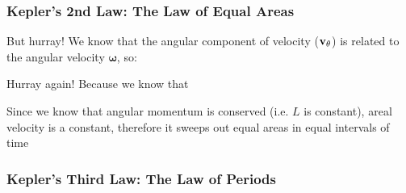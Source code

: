 \documentclass[12pt,compress,aspectratio=169]{beamer}
\newcommand{\mb}[1]{\ensuremath\mathbf{#1}}
\begin{document}
\begin{frame}
  \frametitle{Kepler's 2nd Law: The Law of Equal Areas}

  But hurray! We know that the angular component of velocity ($\mb{v}_\theta$)
  is related to the angular velocity $\bm{\omega}$, so:
    

  Hurray again! Because we know that
    
  \vspace{-.4in}{\Large
    \begin{displaymath}
      rv_\theta=\left|\mb{r}\times\mb{v}_\theta\right|=\left|\frac{\mb{L}}{\mu}\right|=\frac{L}{\mu}
      \quad\longrightarrow\quad
      \boxed{\frac{dA}{dt} =\frac{L}{2\mu}}
    \end{displaymath}
  }

  Since we know that angular momentum is conserved (i.e. $L$ is constant),
  areal velocity is a constant, therefore it sweeps out equal areas in equal
  intervals of time
\end{frame}


\begin{frame}
  \frametitle{Kepler's Third Law: The Law of Periods}
  \begin{center}
  \end{center}
\end{frame}
\end{document}
